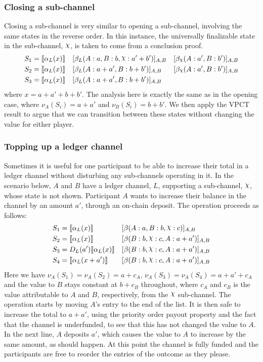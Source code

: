 \documentclass{article}
\DeclareRobustCommand{\rchi}{{\mathpalette\irchi\relax}}
\newcommand{\irchi}[2]{\raisebox{\depth}{$#1\chi$}} %
\theoremstyle{definition}
\newcommand{\adj}[1]{\llbracket #1 \rrbracket}
\newcommand{\enf}[1]{[#1]}
\begin{document}
\subsubsection{Closing a sub-channel}

Closing a sub-channel is very similar to opening a sub-channel, involving the same states in the reverse order.
In this instance, the universally finalizable state in the sub-channel, $\rchi$, is
taken to come from a conclusion proof.
\begin{align*}
S_1 &= \adj{\alpha_L(x)} &&\enf{\beta_L(A: a, B: b, \rchi: a' + b')}_{A, B}&\enf{\beta_\rchi(A: a', B: b')}_{A, B}\\
S_2 &= \adj{\alpha_L(x)} &&\enf{\beta_L(A: a + a', B: b + b')}_{A, B}&\enf{\beta_\rchi(A: a', B: b')}_{A, B} \\
S_3 &= \adj{\alpha_L(x)} &&\enf{\beta_L(A: a + a', B: b + b')}_{A, B} & 
\end{align*}
where $x = a + a' + b + b'$.
The analysis here is exactly the same as in the opening case, where $\nu_A(S_i) = a + a'$ and $\nu_B(S_i) = b + b'$.
We then apply the VPCT result to argue that we can transition between these states without changing the value for either player.

\subsubsection{Topping up a ledger channel}

Sometimes it is useful for one participant to be able to increase their total in a ledger channel without disturbing any sub-channels operating in it.
In the scenario below, $A$ and $B$ have a ledger channel, $L$, supporting a sub-channel, $\rchi$, whose state is not shown.
Participant $A$ wants to increase their balance in the channel by an amount $a'$, through an on-chain deposit.
The operation proceeds as follows:
\begin{align*}
S_1 &= \adj{\alpha_L(x)} &&\enf{\beta(A: a, B: b, \rchi: c)}_{A, B} \\
S_2 &= \adj{\alpha_L(x)} &&\enf{\beta(B: b, \rchi: c, A: a + a')}_{A, B} \\
S_3 &= D_L(a')\adj{\alpha_L(x)} &&\enf{\beta(B: b, \rchi: c, A: a + a')}_{A, B} \\
S_4 &= \adj{\alpha_L(x + a')} &&\enf{\beta(B: b, \rchi: c, A: a + a')}_{A, B}
\end{align*}
Here we have $\nu_A(S_1) = \nu_A(S_2) = a + c_A$, $\nu_A(S_3) = \nu_A(S_4) = a + a' + c_A$ and the value to $B$ stays constant at $b + c_B$ throughout, where $c_A$ and $c_B$ is the value attributable to $A$ and $B$, respectively, from the $\rchi$ sub-channel.
The operation starts by moving $A$'s entry to the end of the list.
It is then safe to increase the total to $a + a'$, using the priority order payout property and the fact that the channel is underfunded, to see that this has not changed the value to $A$.
In the next line, $A$ deposits $a'$, which causes the value to $A$ to increase by the same amount, as should happen.
At this point the channel is fully funded and the participants are free to reorder the entries of the outcome as they please.
\end{document}
